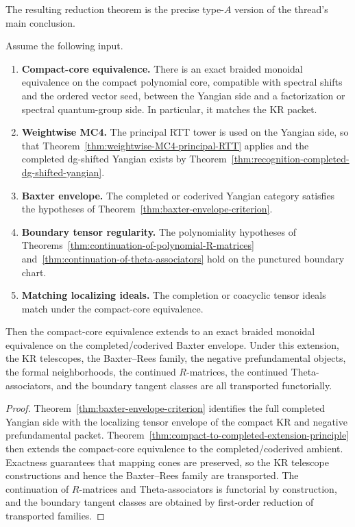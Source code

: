 The resulting reduction theorem is the precise type-$A$ version of the
thread's main conclusion.

\begin{theorem}
\ClaimStatusProvedHere
\label{thm:typeA-reduction-full-derived-DK-frontier}
Assume the following input.
\begin{enumerate}
 \item \textbf{Compact-core equivalence.}
 There is an exact braided monoidal equivalence on the compact
 polynomial core, compatible with spectral shifts and the ordered
 vector seed, between the Yangian side and a factorization or spectral
 quantum-group side. In particular, it matches the KR packet.
 \item \textbf{Weightwise MC4.}
 The principal RTT tower is used on the Yangian side, so that
 Theorem~\ref{thm:weightwise-MC4-principal-RTT} applies and the
 completed dg-shifted Yangian exists by
 Theorem~\ref{thm:recognition-completed-dg-shifted-yangian}.
 \item \textbf{Baxter envelope.}
 The completed or coderived Yangian category satisfies the hypotheses
 of Theorem~\ref{thm:baxter-envelope-criterion}.
 \item \textbf{Boundary tensor regularity.}
 The polynomiality hypotheses of
 Theorems~\ref{thm:continuation-of-polynomial-R-matrices}
 and~\ref{thm:continuation-of-theta-associators} hold on the punctured
 boundary chart.
 \item \textbf{Matching localizing ideals.}
 The completion or coacyclic tensor ideals match under the compact-core
 equivalence.
\end{enumerate}
Then the compact-core equivalence extends to an exact braided monoidal
equivalence on the completed/coderived Baxter envelope. Under this
extension, the KR telescopes, the Baxter--Rees family, the negative
prefundamental objects, the formal neighborhoods, the continued
$R$-matrices, the continued Theta-associators, and the boundary tangent
classes are all transported functorially.
\end{theorem}

\begin{proof}
Theorem~\ref{thm:baxter-envelope-criterion} identifies the full completed
Yangian side with the localizing tensor envelope of the compact KR and
negative prefundamental packet. Theorem~\ref{thm:compact-to-completed-extension-principle}
then extends the compact-core equivalence to the completed/coderived
ambient. Exactness guarantees that mapping cones are preserved, so the KR
telescope constructions and hence the Baxter--Rees family are transported.
The continuation of $R$-matrices and Theta-associators is functorial by
construction, and the boundary tangent classes are obtained by first-order
reduction of transported families.
\end{proof}

